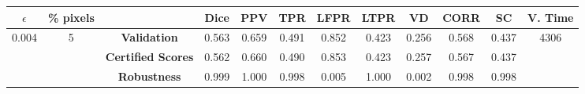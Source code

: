 \begin{longtable}{ c  c | c | c  c  c  c  c  c  c c c}
\toprule \textbf{$\epsilon$} & \textbf{\% pixels} & & \textbf{Dice} & \textbf{PPV} & \textbf{TPR} & \textbf{LFPR} & \textbf{LTPR} & \textbf{VD} & \textbf{CORR} & \textbf{SC} & \textbf{V. Time} \\
\midrule 
\multirow{3}{*}{0.004}  & \multirow{3}{*}{5} &\textbf{Validation} & 0.563 & 0.659 & 0.491 & 0.852 & 0.423 & 0.256 & 0.568 & 0.437 & \multirow{3}{*}{4306} \\
 & & \textbf{Certified Scores} & 0.562 & 0.660 & 0.490 & 0.853 & 0.423 & 0.257 & 0.567 & 0.437 & \\
& & \textbf{Robustness} & 0.999 & 1.000 & 0.998 & 0.005 & 1.000 & 0.002 & 0.998 & 0.998 & \\
\end{longtable}